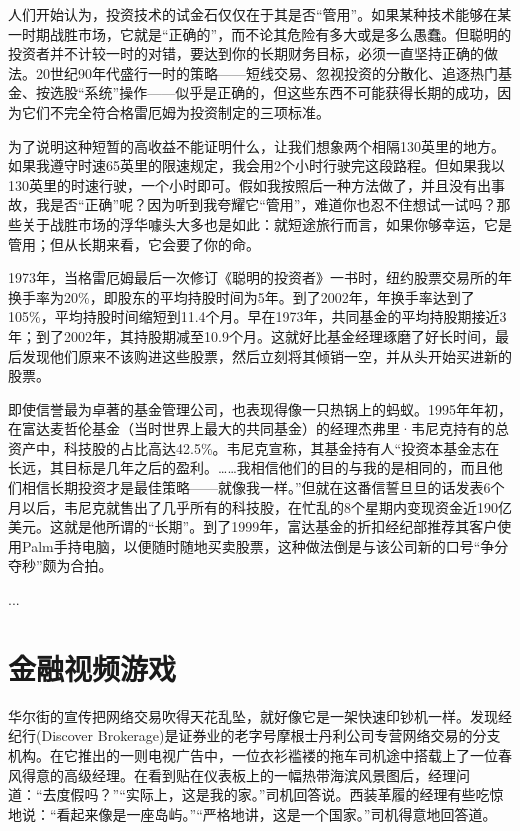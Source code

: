 \documentclass[12pt,oneside]{book}
\begin{document}
人们开始认为，投资技术的试金石仅仅在于其是否“管用”。如果某种技术能够在某一时期战胜市场，它就是“正确的”，而不论其危险有多大或是多么愚蠢。但聪明的投资者并不计较一时的对错，要达到你的长期财务目标，必须一直坚持正确的做法。20世纪90年代盛行一时的策略——短线交易、忽视投资的分散化、追逐热门基金、按选股“系统”操作——似乎是正确的，但这些东西不可能获得长期的成功，因为它们不完全符合格雷厄姆为投资制定的三项标准。

为了说明这种短暂的高收益不能证明什么，让我们想象两个相隔130英里的地方。如果我遵守时速65英里的限速规定，我会用2个小时行驶完这段路程。但如果我以130英里的时速行驶，一个小时即可。假如我按照后一种方法做了，并且没有出事故，我是否“正确”呢？因为听到我夸耀它“管用”，难道你也忍不住想试一试吗？那些关于战胜市场的浮华噱头大多也是如此：就短途旅行而言，如果你够幸运，它是管用；但从长期来看，它会要了你的命。

1973年，当格雷厄姆最后一次修订《聪明的投资者》一书时，纽约股票交易所的年换手率为20\%，即股东的平均持股时间为5年。到了2002年，年换手率达到了105\%，平均持股时间缩短到11.4个月。早在1973年，共同基金的平均持股期接近3年；到了2002年，其持股期减至10.9个月。这就好比基金经理琢磨了好长时间，最后发现他们原来不该购进这些股票，然后立刻将其倾销一空，并从头开始买进新的股票。

即使信誉最为卓著的基金管理公司，也表现得像一只热锅上的蚂蚁。1995年年初，在富达麦哲伦基金（当时世界上最大的共同基金）的经理杰弗里·韦尼克持有的总资产中，科技股的占比高达42.5\%。韦尼克宣称，其基金持有人“投资本基金志在长远，其目标是几年之后的盈利。……我相信他们的目的与我的是相同的，而且他们相信长期投资才是最佳策略——就像我一样。”但就在这番信誓旦旦的话发表6个月以后，韦尼克就售出了几乎所有的科技股，在忙乱的8个星期内变现资金近190亿美元。这就是他所谓的“长期”。到了1999年，富达基金的折扣经纪部推荐其客户使用Palm手持电脑，以便随时随地买卖股票，这种做法倒是与该公司新的口号“争分夺秒”颇为合拍。

...

\section{金融视频游戏}
华尔街的宣传把网络交易吹得天花乱坠，就好像它是一架快速印钞机一样。发现经纪行(Discover Brokerage)是证券业的老字号摩根士丹利公司专营网络交易的分支机构。在它推出的一则电视广告中，一位衣衫褴褛的拖车司机途中搭载上了一位春风得意的高级经理。在看到贴在仪表板上的一幅热带海滨风景图后，经理问道：“去度假吗？”“实际上，这是我的家。”司机回答说。西装革履的经理有些吃惊地说：“看起来像是一座岛屿。”“严格地讲，这是一个国家。”司机得意地回答道。
\end{document}
